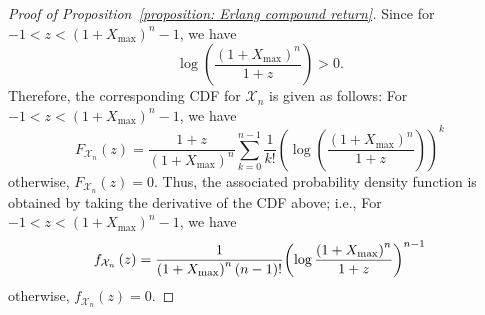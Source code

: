 \begin{proof}[Proof of Proposition~\ref{proposition: Erlang compound return}]
Since for $-1 < z < (1+X_{\max})^n -1 $, we have
\[\log \left( {\frac{{{{\left( {1 + {X_{\max }}} \right)}^n}}}{{1 + z}}} \right) > 0.
\]
Therefore, the corresponding CDF for $\mathcal{X}_n$ is given as follows: For $-1<z < {\left( {1 + X_{\max}} \right)^n} - 1$, we have
 $$
 F_{\mathcal{X}_n}(z ) =\frac{{1 + z}}{{{{\left( {1 + X_{\max}} \right)}^n}}}\sum_{k = 0}^{n - 1} {\frac{1}{{k!}}{{\left( {\log \left( {\frac{{{{\left( {1 + X_{\max}} \right)}^n}}}{{1 + z}}} \right)} \right)}^k}}
 $$
otherwise, $F_{\mathcal{X}_n}(z ) = 0.$
Thus, the associated probability density function is obtained by taking the derivative of the CDF above; i.e., For~${ - 1 < z < {{\left( {1 + {X_{\max }}} \right)}^n} - 1}$, we have
\[{f_{{\cal X}_n } }\left( z \right) = \frac{1}{{{{(1 + {X_{\max }})}^n}\left( {n - 1} \right)!}}{\left( {\log \frac{{{{(1 + {X_{\max }})}^n}}}{{1 + z}}} \right)^{n - 1}}\]	
otherwise, $f_{\mathcal{X}_n}(z)=0.$  
\end{proof}
 


          


